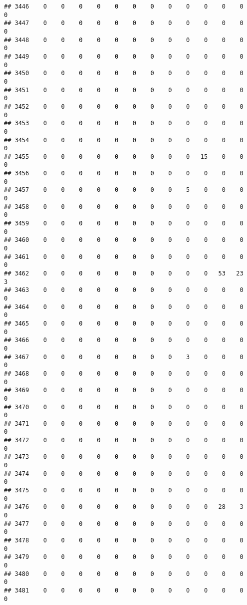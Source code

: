 \documentclass[]{article}
\begin{document}
\begin{verbatim}
## 3446    0    0    0    0    0    0    0    0    0    0    0    0    0
## 3447    0    0    0    0    0    0    0    0    0    0    0    0    0
## 3448    0    0    0    0    0    0    0    0    0    0    0    0    0
## 3449    0    0    0    0    0    0    0    0    0    0    0    0    0
## 3450    0    0    0    0    0    0    0    0    0    0    0    0    0
## 3451    0    0    0    0    0    0    0    0    0    0    0    0    0
## 3452    0    0    0    0    0    0    0    0    0    0    0    0    0
## 3453    0    0    0    0    0    0    0    0    0    0    0    0    0
## 3454    0    0    0    0    0    0    0    0    0    0    0    0    0
## 3455    0    0    0    0    0    0    0    0    0   15    0    0    0
## 3456    0    0    0    0    0    0    0    0    0    0    0    0    0
## 3457    0    0    0    0    0    0    0    0    5    0    0    0    0
## 3458    0    0    0    0    0    0    0    0    0    0    0    0    0
## 3459    0    0    0    0    0    0    0    0    0    0    0    0    0
## 3460    0    0    0    0    0    0    0    0    0    0    0    0    0
## 3461    0    0    0    0    0    0    0    0    0    0    0    0    0
## 3462    0    0    0    0    0    0    0    0    0    0   53   23    3
## 3463    0    0    0    0    0    0    0    0    0    0    0    0    0
## 3464    0    0    0    0    0    0    0    0    0    0    0    0    0
## 3465    0    0    0    0    0    0    0    0    0    0    0    0    0
## 3466    0    0    0    0    0    0    0    0    0    0    0    0    0
## 3467    0    0    0    0    0    0    0    0    3    0    0    0    0
## 3468    0    0    0    0    0    0    0    0    0    0    0    0    0
## 3469    0    0    0    0    0    0    0    0    0    0    0    0    0
## 3470    0    0    0    0    0    0    0    0    0    0    0    0    0
## 3471    0    0    0    0    0    0    0    0    0    0    0    0    0
## 3472    0    0    0    0    0    0    0    0    0    0    0    0    0
## 3473    0    0    0    0    0    0    0    0    0    0    0    0    0
## 3474    0    0    0    0    0    0    0    0    0    0    0    0    0
## 3475    0    0    0    0    0    0    0    0    0    0    0    0    0
## 3476    0    0    0    0    0    0    0    0    0    0   28    3    0
## 3477    0    0    0    0    0    0    0    0    0    0    0    0    0
## 3478    0    0    0    0    0    0    0    0    0    0    0    0    0
## 3479    0    0    0    0    0    0    0    0    0    0    0    0    0
## 3480    0    0    0    0    0    0    0    0    0    0    0    0    0
## 3481    0    0    0    0    0    0    0    0    0    0    0    0    0

\end{verbatim}
\end{document}
